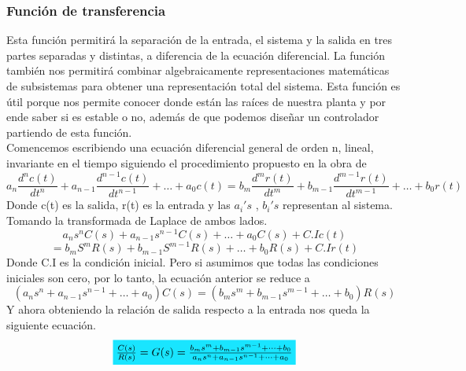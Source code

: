 \subsubsection{Función de transferencia}
Esta función permitirá la separación de la entrada, el sistema y la salida en tres partes separadas y
distintas, a diferencia de la ecuación diferencial. La función también nos permitirá combinar
algebraicamente representaciones matemáticas de subsistemas para obtener una representación total
del sistema. Esta función es útil porque nos permite conocer donde están las raíces de nuestra planta y por ende saber si es estable o no,
además de que podemos diseñar un controlador partiendo de esta función.\\
Comencemos escribiendo una ecuación diferencial general de orden n, lineal, invariante en el tiempo siguiendo el procedimiento propuesto
en la obra de \cite{Book:Nise2010}
\begin{equation}
	a_n \frac{d^nc(t)}{dt^n} + a_{n-1} \frac{d^{n-1}c(t)}{dt^{n-1}} + \dots + a_0c(t) = b_m \frac{d^mr(t)}{dt^m} +
	b_{m-1} \frac{d^{m-1}r(t)}{dt^{m-1}} + \dots + b_0r(t)
\end{equation}
Donde c(t) es la salida, r(t) es la entrada y las $a_i's$ , $b_i's$ representan al sistema. Tomando la transformada de Laplace de ambos
lados.
\begin{equation*}
	a_ns^nC(s) + a_{n-1}s^{n-1}C(s) + \dots + a_0C(s) + C.I c(t)
\end{equation*}
\begin{equation}
	= b_mS^mR(s) + b_{m-1}S^{m-1}R(s) + \dots + b_0R(s) + C.I r(t)
\end{equation}
Donde C.I es la condición inicial. Pero si asumimos que todas las condiciones iniciales son cero, por lo tanto, la ecuación anterior
se reduce a
\begin{equation}
	(a_ns^n + a_{n-1}s^{n-1} + \dots + a_0)C(s) = (b_ms^m + b_{m-1}s^{m-1} + \dots + b_0)R(s)
\end{equation}
Y ahora obteniendo la relación de salida respecto a la entrada nos queda la siguiente ecuación.
\begin{equation}
	\colorbox[rgb]{0.1,0.9,1}{$ \frac{C(s)}{R(s)} = G(s) = \frac{b_ms^m + b_{m-1}s^{m-1} + \dots + b_0}{a_ns^n + a_{n-1}s^{n-1} + \dots + a_0} $}
\end{equation}

